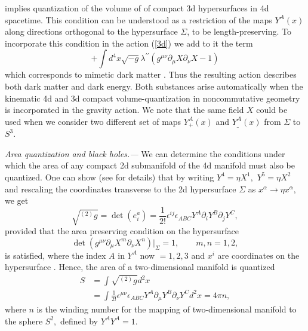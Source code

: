 \documentclass
[twocolumn,prl,unsortedaddress,superscriptaddress,showpacs]{revtex4}%
\begin{document}
implies quantization of the volume of of compact 3d hypersurfaces in 4d
spacetime. This condition can be understood as a restriction of the maps
$Y^{A}\left(  x\right)  $ along directions orthogonal to the hypersurface
$\Sigma$, to be length-preserving. To incorporate this condition in the action
(\ref{3d}) we add to it the term%
\begin{equation}
+\int d^{4}x\sqrt{-g}\lambda^{\prime\prime}\left(  g^{\mu\nu}\partial_{\mu
}X\partial_{\nu}X-1\right)  \label{24a}%
\end{equation}
which corresponds to mimetic dark matter \cite{CM,CMV}. Thus the resulting
action describes both dark matter and dark energy. Both substances arise
automatically when the kinematic 4d and 3d compact volume-quantization in
noncommutative geometry is incorporated in the gravity action. We note that
the same field $X$ could be used when we consider two different set of maps
$Y_{+}^{A}\left(  x\right)  $ and $Y_{\_}^{A}\left(  x\right)  $ from $\Sigma$
to $S^{3}.$

\emph{Area quantization and black holes.---}
We can determine the conditions under which the area of any compact 2d
submanifold of the 4d manifold must also be quantized. One can show (see
\cite{CCM2} for details) that by writing $Y^{4}=\eta X^{1},$ $Y^{5}=\eta
X^{2}$ and rescaling the coordinates transverse to the 2d hypersurface
$\Sigma$ as $x^{\alpha}\rightarrow\eta x^{\alpha},$ we get%
\begin{equation}
\sqrt{^{\left(  2\right)  }g}=\det\left(  e_{i}^{a}\right)  =\frac{1}%
{2!}\epsilon^{ij}\epsilon_{ABC}Y^{A}\partial_{i}Y^{B}\partial_{j}Y^{C},
\end{equation}
provided that the area preserving condition on the hypersurface
\begin{equation}
\det\left(  g^{\mu\nu}\partial_{\mu}X^{m}\partial_{\nu}X^{n}\right)
|_{\Sigma}=1,\qquad m,n=1,2,
\end{equation}
is satisfied, where the index $A$ in $Y^{A}$ now $=1,2,3$ and $x^{i}$ are
coordinates on the hypersurface . Hence, the area of a two-dimensional
manifold is quantized%
\begin{align}
S  &  =%
{\displaystyle\int}
\sqrt{^{\left(  2\right)  }g}d^{2}x\nonumber\\
&  =\int\frac{1}{2!}\epsilon^{\mu\nu}\epsilon_{ABC}Y^{A}\partial_{\mu}%
Y^{B}\partial_{\nu}Y^{C}d^{2}x=4\pi n,
\end{align}
where $n$ is the winding number for the mapping of two-dimensional manifold to
the sphere $S^{2},$ defined by $Y^{A}Y^{A}=1.$
\end{document}
